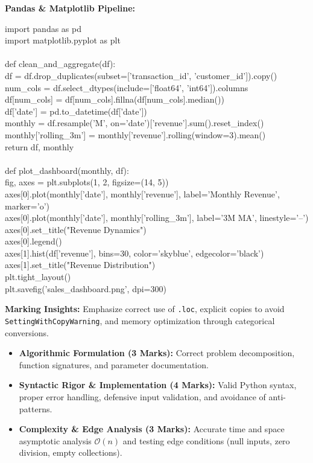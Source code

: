 \begin{solbox}
\textbf{Pandas \& Matplotlib Pipeline:}
\begin{pycode}
import pandas as pd\\
import matplotlib.pyplot as plt\\
~\\
def clean\_and\_aggregate(df):\\
\quad df = df.drop\_duplicates(subset=['transaction\_id', 'customer\_id']).copy()\\
\quad num\_cols = df.select\_dtypes(include=['float64', 'int64']).columns\\
\quad df[num\_cols] = df[num\_cols].fillna(df[num\_cols].median())\\
\quad df['date'] = pd.to\_datetime(df['date'])\\
\quad monthly = df.resample('M', on='date')['revenue'].sum().reset\_index()\\
\quad monthly['rolling\_3m'] = monthly['revenue'].rolling(window=3).mean()\\
\quad return df, monthly\\
~\\
def plot\_dashboard(monthly, df):\\
\quad fig, axes = plt.subplots(1, 2, figsize=(14, 5))\\
\quad axes[0].plot(monthly['date'], monthly['revenue'], label='Monthly Revenue', marker='o')\\
\quad axes[0].plot(monthly['date'], monthly['rolling\_3m'], label='3M MA', linestyle='--')\\
\quad axes[0].set\_title("Revenue Dynamics")\\
\quad axes[0].legend()\\
\quad axes[1].hist(df['revenue'], bins=30, color='skyblue', edgecolor='black')\\
\quad axes[1].set\_title("Revenue Distribution")\\
\quad plt.tight\_layout()\\
\quad plt.savefig('sales\_dashboard.png', dpi=300)
\end{pycode}
\textbf{Marking Insights:} Emphasize correct use of \texttt{.loc}, explicit copies to avoid \texttt{SettingWithCopyWarning}, and memory optimization through categorical conversions.
\end{solbox}

\begin{examinertip}
\begin{itemize}[leftmargin=1.5em, itemsep=2pt]
    \item \textbf{Algorithmic Formulation (3 Marks):} Correct problem decomposition, function signatures, and parameter documentation.
    \item \textbf{Syntactic Rigor \& Implementation (4 Marks):} Valid Python syntax, proper error handling, defensive input validation, and avoidance of anti-patterns.
    \item \textbf{Complexity \& Edge Analysis (3 Marks):} Accurate time and space asymptotic analysis $\mathcal{O}(n)$ and testing edge conditions (null inputs, zero division, empty collections).
\end{itemize}
\end{examinertip}
